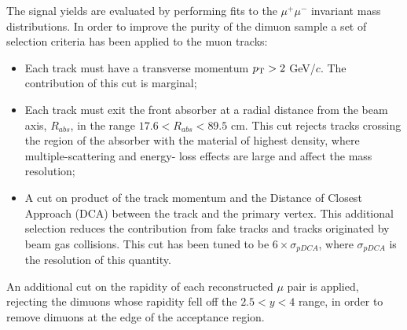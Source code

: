 The signal yields are evaluated by performing fits to the $\mu^+\mu^-$ invariant mass distributions.
In order to improve the purity of the dimuon sample a set of selection criteria has been applied to the muon tracks:
\begin{itemize}
\item Each track must have a transverse momentum $p_{\rm T} > 2$ GeV/$c$. 
The contribution of this cut is marginal;
\item Each track must exit the front absorber at a radial distance from the beam axis, $R_{abs}$, in the range $17.6 <R_{abs}< 89.5$ cm. This cut rejects tracks crossing the region of the absorber with the material of highest density, where multiple-scattering and energy- loss effects are large and affect the mass resolution;
\item A cut on product of the track momentum and the Distance of Closest Approach (DCA) between the track and the primary vertex. This additional selection reduces the contribution from fake tracks and tracks originated by beam gas collisions. This cut has been tuned to be $6\times\sigma_{pDCA}$, where $\sigma_{pDCA}$ is the resolution of this quantity.

\end{itemize}
An additional cut on the rapidity of each reconstructed $\mu$ pair is applied, rejecting the dimuons whose rapidity fell off the $2.5 < y < 4$ range, in order to remove dimuons at the edge of the acceptance region.

